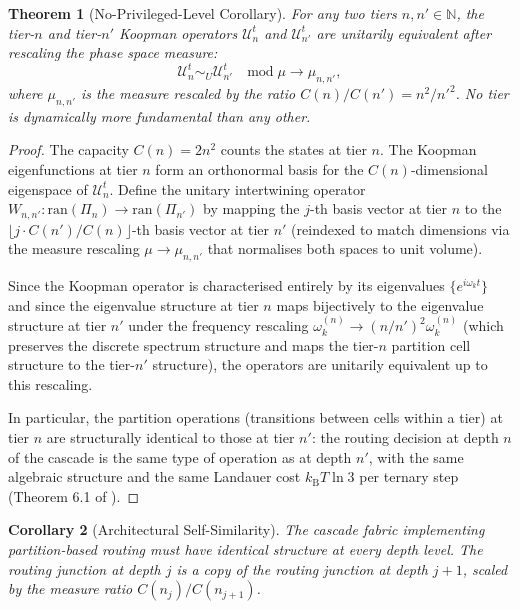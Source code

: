 \documentclass[11pt,twocolumn,a4paper]{article}
\newtheorem{theorem}{Theorem}[section]
\newtheorem{corollary}[theorem]{Corollary}
\theoremstyle{remark}
\newcommand{\kB}{k_{\mathrm{B}}}
\newcommand{\N}{\mathbb{N}}
\begin{document}
\begin{theorem}[No-Privileged-Level Corollary]
\label{thm:npl}
For any two tiers $n, n' \in \N$, the tier-$n$ and tier-$n'$ Koopman operators
$\mathcal{U}^t_n$ and $\mathcal{U}^t_{n'}$ are unitarily equivalent after
rescaling the phase space measure:
\begin{equation}
\mathcal{U}^t_n \sim_U \mathcal{U}^t_{n'} \quad \mathrm{mod} \; \mu \to \mu_{n,n'},
\label{eq:npl}
\end{equation}
where $\mu_{n,n'}$ is the measure rescaled by the ratio $C(n)/C(n') = n^2/n'^2$.
No tier is dynamically more fundamental than any other.
\end{theorem}

\begin{proof}
The capacity $C(n) = 2n^2$ counts the states at tier $n$. The Koopman eigenfunctions
at tier $n$ form an orthonormal basis for the $C(n)$-dimensional eigenspace of
$\mathcal{U}^t_n$. Define the unitary intertwining operator $W_{n,n'}: \mathrm{ran}(\Pi_n)
\to \mathrm{ran}(\Pi_{n'})$ by mapping the $j$-th basis vector at tier $n$
to the $\lfloor j \cdot C(n')/C(n) \rfloor$-th basis vector at tier $n'$
(reindexed to match dimensions via the measure rescaling $\mu \to \mu_{n,n'}$
that normalises both spaces to unit volume).

Since the Koopman operator is characterised entirely by its eigenvalues
$\{e^{i\omega_k t}\}$ and since the eigenvalue structure at tier $n$ maps
bijectively to the eigenvalue structure at tier $n'$ under the frequency rescaling
$\omega_k^{(n)} \to (n/n')^2 \omega_k^{(n)}$ (which preserves the discrete spectrum
structure and maps the tier-$n$ partition cell structure to the tier-$n'$ structure),
the operators are unitarily equivalent up to this rescaling.

In particular, the partition operations (transitions between cells within a tier)
at tier $n$ are structurally identical to those at tier $n'$: the routing decision
at depth $n$ of the cascade is the same type of operation as at depth $n'$,
with the same algebraic structure and the same Landauer cost $\kB T \ln 3$ per
ternary step (Theorem 6.1 of \citep{companion4}).
\end{proof}

\begin{corollary}[Architectural Self-Similarity]
\label{cor:selfsim}
The cascade fabric implementing partition-based routing must have identical
structure at every depth level. The routing junction at depth $j$ is a copy
of the routing junction at depth $j+1$, scaled by the measure ratio
$C(n_j) / C(n_{j+1})$.
\end{corollary}
\end{document}
